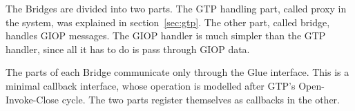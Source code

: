 \documentclass[12pt,a4paper,draft]{article}
\begin{document}
The Bridges are divided into two parts.  The GTP handling part, called
proxy in the system, was explained in section~\ref{sec:gtp}.  The
other part, called bridge, handles GIOP messages.  The GIOP handler is
much simpler than the GTP handler, since all it has to do is pass
through GIOP data.

The parts of each Bridge communicate only through the Glue interface.
This is a minimal callback interface, whose operation is modelled
after GTP's Open-Invoke-Close cycle.  The two parts register
themselves as callbacks in the other.
\end{document}
